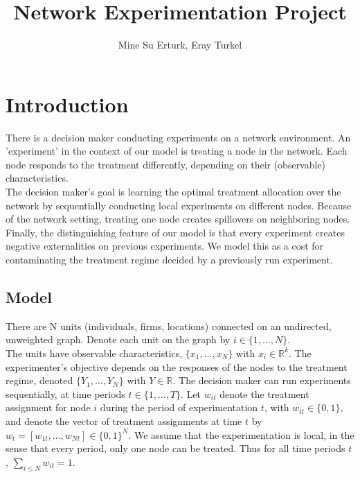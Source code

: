 \documentclass[12pt,a4paper]{article}
\author{Mine Su Erturk, Eray Turkel}
\title{Network Experimentation Project}
\begin{document}
\maketitle

\section{Introduction}

There is a decision maker conducting experiments on a network environment. An 'experiment' in the context of our model is treating a node in the network. Each node responds to the treatment differently, depending on their (observable) characteristics.\\

The decision maker's goal is learning the optimal treatment allocation over the network by sequentially conducting local experiments on different nodes. Because of the network setting, treating one node creates spillovers on neighboring nodes.\\

Finally, the distinguishing feature of our model is that every experiment creates negative externalities on previous experiments. We model this as a cost for contaminating the treatment regime decided by a previously run experiment.\\

\subsection{Model}

There are N units (individuals, firms, locations) connected on an undirected, unweighted graph. Denote each unit on the graph by $i \in \{1, \dots, N \}$. \\

The units have observable characteristics, $\{x_1 , \dots, x_N \}$ with $x_i \in \mathbb{R}^k$. The experimenter's objective depends on the responses of the nodes to the treatment regime, denoted $\{Y_1 , \dots, Y_N\}$ with $Y \in \mathbb{R}$. The decision maker can run experiments sequentially, at time periods $t \in \{1, \dots , T\}$. Let $w_{it}$ denote the treatment assignment for node $i$ during the period of experimentation $t$, with $w_{it} \in \{0,1\}$, and denote the vector of treatment assignments at time $t$ by $w_t = [w_{1t}, \dots , w_{Nt}] \in \{0,1\}^N$. We assume that the experimentation is local, in the sense that every period, only one node can be treated. Thus for all time periods $t$, $\sum_{i \leq N} w_{it} = 1$.\\
\end{document}
